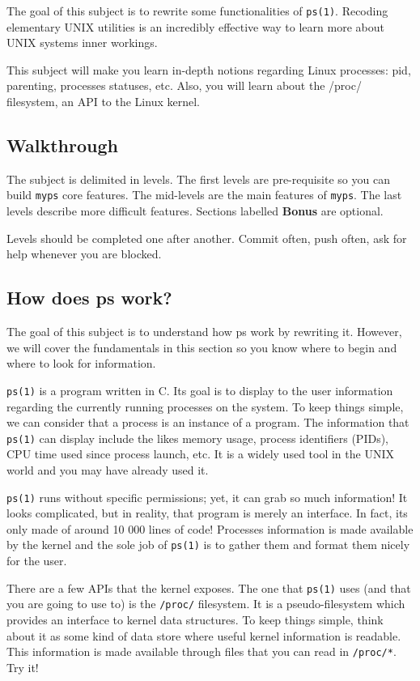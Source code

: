 \documentclass[12pt]{article}
\begin{document}
The goal of this subject is to rewrite some functionalities of \texttt{ps(1)}. Recoding elementary UNIX utilities is an incredibly effective way to learn more about UNIX systems inner workings.

This subject will make you learn in-depth notions regarding Linux processes: pid, parenting, processes statuses, etc. Also, you will learn about the /proc/ filesystem, an API to the Linux kernel.


\subsection{Walkthrough}

The subject is delimited in levels. The first levels are pre-requisite so you can build \texttt{myps} core features. The mid-levels are the main features of \texttt{myps}. The last levels describe more difficult features. Sections labelled \textbf{Bonus} are optional.

Levels should be completed one after another. Commit often, push often, ask for help whenever you are blocked.

\subsection{How does ps work?}

The goal of this subject is to understand how ps work by rewriting it. However, we will cover the fundamentals in this section so you know where to begin and where to look for information.

\texttt{ps(1)} is a program written in C. Its goal is to display to the user information regarding the currently running processes on the system. To keep things simple, we can consider that a process is an instance of a program.
The information that \texttt{ps(1)} can display include the likes memory usage, process identifiers (PIDs), CPU time used since process launch, etc. It is a widely used tool in the UNIX world and you may have already used it.

\texttt{ps(1)} runs without specific permissions; yet, it can grab so much information! It looks complicated, but in reality, that program is merely an interface. In fact, its only made of around 10 000 lines of code! Processes information is made available by the kernel and the sole job of \texttt{ps(1)} is to gather them and format them nicely for the user.

There are a few APIs that the kernel exposes. The one that \texttt{ps(1)} uses (and that you are going to use to) is the \texttt{/proc/} filesystem. It is a pseudo-filesystem which provides an interface to kernel data structures. To keep things simple, think about it as some kind of data store where useful kernel information is readable.
This information is made available through files that you can read in \texttt{/proc/*}. Try it!
\end{document}
